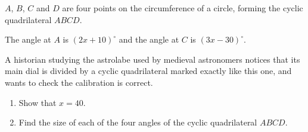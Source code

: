 \begin{question}
\noindent $A$, $B$, $C$ and $D$ are four points on the circumference of a circle, forming the cyclic quadrilateral $ABCD$.

\noindent The angle at $A$ is $(2x+10)^\circ$ and the angle at $C$ is $(3x-30)^\circ$.

\begin{center}
\end{center}

\noindent A historian studying the astrolabe used by medieval astronomers notices that its main dial is divided by a cyclic quadrilateral marked exactly like this one, and wants to check the calibration is correct.

\begin{enumerate}
    \item[(a)] Show that $x = 40$.

    \vspace{4cm}

    \item[(b)] Find the size of each of the four angles of the cyclic quadrilateral $ABCD$.

    \vspace{5cm}
\end{enumerate}
\end{question}